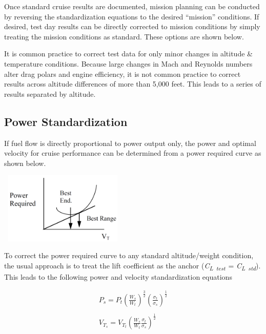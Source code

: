 \documentclass[
]{book}
\begin{document}
Once standard cruise results are documented, mission planning can be conducted
by reversing the standardization equations to the desired ``mission'' conditions.
If desired, test day results can be directly corrected to mission conditions by
simply treating the mission conditions as standard. These options are shown
below.

It is common practice to correct test data for only minor changes in altitude \&
temperature conditions. Because large changes in Mach and Reynolds numbers alter
drag polars and engine efficiency, it is not common practice to correct results
across altitude differences of more than 5,000 feet. This leads to a series of
results separated by altitude.

\hypertarget{power-standardization}{%
\subsection{Power Standardization}\label{power-standardization}}

If fuel flow is directly proportional to power output only, the power and
optimal velocity for cruise performance can be determined from a power required
curve as shown below.

\includegraphics[width=2.38542in,height=1.33542in]{media/12/power-speed-curve.png}

To correct the power required curve to any standard altitude/weight condition, the usual approach is to treat the lift coefficient as the anchor (\emph{C\textsubscript{L~test~}}= \emph{C\textsubscript{L~std}}). This leads to the following power and velocity standardization equations

\[
\begin{align}
P_s = P_t \left( \frac{W_s}{W_t} \right)^{\frac{3}{2}} \left( \frac{\sigma_t}{\sigma_s} \right)^{\frac{1}{2}} \\
\\
V_{T_s} = V_{T_t} \left( \frac{W_s}{W_t} \frac{\sigma_t}{\sigma_s} \right)^{\frac{1}{2}}\\
\end{align}
\label{eq:pwr-vel-std}
\]
\end{document}

